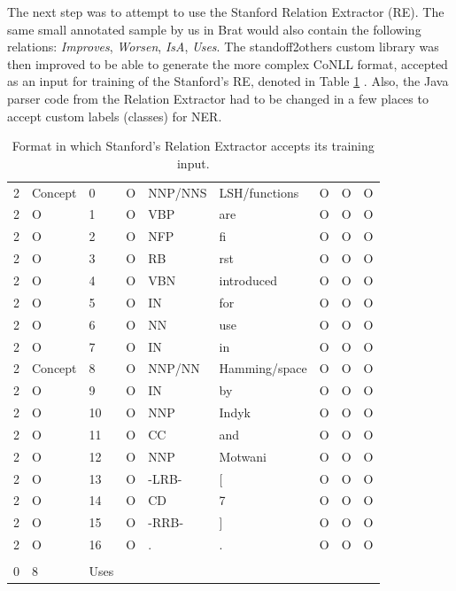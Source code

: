 \documentclass[11pt,a4paper,openright]{memoir}
\begin{document}
The next step was to attempt to use the Stanford Relation Extractor (RE). The same small annotated sample by us in Brat would also contain the following relations: \emph{Improves}, \emph{Worsen}, \emph{IsA}, \emph{Uses}. The standoff2others custom library was then improved to be able to generate the more complex CoNLL format, accepted as an input for training of the Stanford's RE, denoted in Table \ref{tab:format_for_relation_extractor_input} \cite{Surdeanu:2011:CIE:2021153.2021155}. Also, the Java parser code from the Relation Extractor had to be changed in a few places to accept custom labels (classes) for NER.

\begin{table}[!htbp]
  \centering
    \begin{tabular}{lllllllll}
2 &	Concept &	0 &	O &	NNP/NNS &	LSH/functions &	O &	O &	O \\
2 &	O &	1 &	O &	VBP &	are & 	O &	O &	O \\
2 &	O &	2 &	O &	NFP &	fi &	O &	O &	O \\
2 &	O &	3 &	O &	RB &	 rst &	O &	O &	O \\
2 &	O &	4 &	O &	VBN &	introduced &	O &	O &	O \\
2 &	O &	5 &	O &	IN &	for &	O &	O &	O \\
2 &	O &	6 &	O &	NN &	use &	O &	O &	O \\
2 &	O &	7 &	O &	IN &	in &	O &	O &	O \\
2 &	Concept &	8 &	O &	NNP/NN &	Hamming/space &	O &	O &	O \\
2 &	O &	9 &	O &	IN &	by &	O &	O &	O \\
2 &	O &	10 &	O &	NNP &	Indyk &	O &	O &	O \\
2 &	O &	11 &	 O &	CC &	and &	O &	O &	O \\
2 &	O &	12 &	O &	NNP &	Motwani &	O &	O &	O \\
2 &	O &	13 &	O &	-LRB- &	[ &	O &	O &	O \\
2 &	O &	14 &	O &	CD &	7 &	O &	O &	O \\
2 &	O &	15 &	O &	-RRB- &	] &	O &	O &	O \\
2 &	O &	16 &	O &	. &	. &	O &	O &	O \\
 & & & & & & & & \\
0 & 8 & Uses & & & & & & \\
    \end{tabular}
  \caption[Format in which Stanford's Relation Extractor accepts its training input.]{Format in which Stanford's Relation Extractor accepts its training input.}
  \label{tab:format_for_relation_extractor_input}
\end{table}
\end{document}
